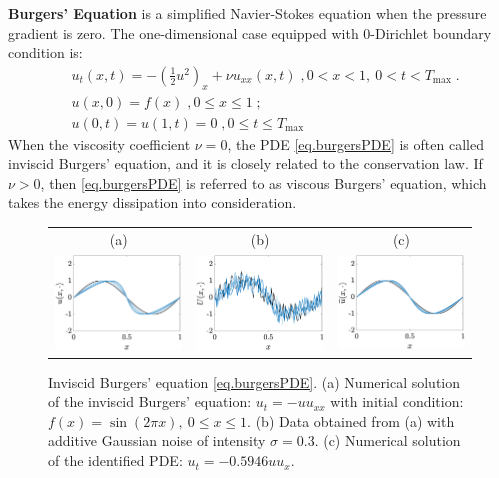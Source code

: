 \documentclass[a4paper,11pt]{article}
\theoremstyle{definition}
\begin{document}
\textbf{Burgers' Equation} is  a simplified Navier-Stokes equation when the pressure gradient is zero. The one-dimensional case equipped with 0-Dirichlet boundary condition is:
\begin{align}
&u_t(x,t) = -(\frac{1}{2}u^2)_x+\nu u_{xx}(x,t)\;,0<x<1,~0<t<T_{\max}\;.\label{eq.burgersPDE}\\
&u(x,0)=f(x)\;, 0\leq x\leq 1\;; \nonumber \\%
&u(0,t)=u(1,t)=0\;,0\leq t\leq T_{\max} \nonumber %
\end{align}
When the viscosity coefficient $\nu=0$, the PDE \eqref{eq.burgersPDE} is often called inviscid Burgers' equation, and it is closely related to the conservation law. If $\nu>0$, then \eqref{eq.burgersPDE} is referred to as viscous Burgers' equation, which takes the energy dissipation into consideration.



\begin{figure}
\centering
\begin{tabular}{ccc}
(a)&(b)&(c)\\
\includegraphics[width=2in]{Figures/burgers_sol.eps}&
\includegraphics[width=2in]{Figures/burgers_noise.eps}&
\includegraphics[width=2in]{Figures/burgers_resimul.eps}
\end{tabular}
\caption{Inviscid Burgers' equation \eqref{eq.burgersPDE}.  (a) Numerical solution of the inviscid Burgers' equation: $u_t=-uu_{xx}$ with initial condition: $f(x)=\sin(2\pi x),~0\leq x\leq 1$. (b) Data obtained from (a) with additive Gaussian noise of intensity $\sigma=0.3$. (c) Numerical solution of the identified PDE: $u_t=-0.5946uu_{x}$. }	\label{fig.burgers}
\end{figure}
\end{document}
